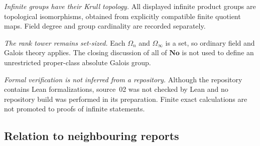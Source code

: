 \documentclass[11pt,letterpaper]{article}
\theoremstyle{definition}
\theoremstyle{remark}
\newcommand{\No}{\mathbf{No}}
\begin{document}
\emph{Infinite groups have their Krull topology.} All displayed infinite
product groups are topological isomorphisms, obtained from explicitly
compatible finite quotient maps. Field degree and group cardinality are
recorded separately.

\emph{The rank tower remains set-sized.} Each $\Omega_n$ and $\Omega_\infty$
is a set, so ordinary field and Galois theory applies. The closing discussion
of all of $\No$ is not used to define an unrestricted proper-class absolute
Galois group.

\emph{Formal verification is not inferred from a repository.} Although the
repository contains Lean formalizations, source~02 was not checked by Lean
and no repository build was performed in its preparation. Finite exact
calculations are not promoted to proofs of infinite statements.

\subsection{Relation to neighbouring reports}\label{bst:gr:subsec:neighbours}
\end{document}

